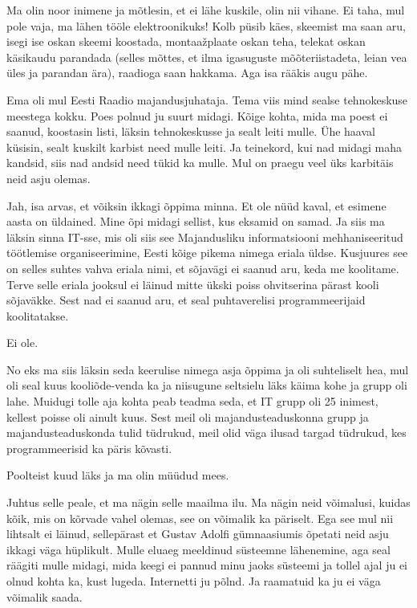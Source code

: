 Ma olin noor inimene ja mõtlesin, et ei lähe kuskile, olin nii vihane. Ei taha, 
mul pole vaja, ma lähen tööle elektroonikuks! Kolb püsib käes, skeemist ma saan 
aru, isegi ise oskan skeemi koostada, montaažplaate oskan teha, telekat oskan 
käsikaudu parandada (selles mõttes, et ilma igasuguste mõõteriistadeta, leian 
vea üles ja parandan ära), raadioga saan hakkama. Aga isa rääkis augu pähe. 


Ema oli mul Eesti Raadio 
majandusjuhataja. Tema viis mind sealse tehnokeskuse meestega kokku. Poes 
polnud ju suurt midagi. Kõige kohta, mida ma poest ei saanud, koostasin listi, 
läksin tehnokeskusse ja sealt leiti mulle. Ühe haaval küsisin, sealt kuskilt 
karbist need mulle leiti. Ja teinekord, kui nad midagi maha kandsid, siis nad 
andsid need tükid ka mulle. Mul on praegu veel üks karbitäis neid asju olemas.


Jah, isa arvas, et võiksin ikkagi õppima minna. Et ole nüüd kaval, et esimene 
aasta on üldained. Mine õpi midagi sellist, kus eksamid on samad. Ja siis ma 
läksin sinna IT-sse, mis oli siis see  Majandusliku informatsiooni 
mehhaniseeritud töötlemise organiseerimine, Eesti kõige pikema nimega eriala 
üldse. Kusjuures see on selles suhtes vahva eriala nimi, et sõjavägi ei saanud 
aru, keda me koolitame. Terve selle eriala jooksul ei läinud mitte ükski poiss 
ohvitserina pärast kooli sõjaväkke. Sest nad ei saanud aru, et seal 
puhtaverelisi programmeerijaid koolitatakse.


Ei ole. 

No eks  ma siis läksin seda keerulise nimega asja õppima ja oli suhteliselt 
hea, mul oli seal kuus kooliõde-venda ka  ja niisugune seltsielu läks käima 
kohe ja grupp oli lahe. Muidugi tolle aja kohta peab teadma seda, et IT grupp 
oli 25 inimest, kellest poisse oli ainult kuus. Sest meil oli 
majandusteaduskonna grupp ja majandusteaduskonda tulid tüdrukud, meil olid väga 
ilusad targad tüdrukud, kes programmeerisid ka päris kõvasti. 

Poolteist kuud läks ja ma olin müüdud mees.


Juhtus selle peale, et ma nägin selle maailma ilu. Ma nägin neid võimalusi, 
kuidas kõik, mis on kõrvade vahel olemas, see on võimalik ka päriselt. Ega see 
mul nii lihtsalt ei läinud, sellepärast et Gustav Adolfi gümnaasiumis õpetati 
neid asju ikkagi väga hüplikult. Mulle eluaeg meeldinud süsteemne lähenemine, 
aga seal räägiti mulle midagi, mida keegi ei pannud minu jaoks süsteemi ja 
tollel ajal ju ei olnud kohta ka, kust lugeda. Internetti ju põlnd. Ja 
raamatuid ka ju ei väga võimalik saada. 

